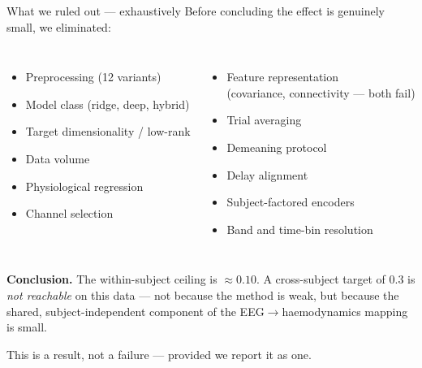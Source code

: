 \documentclass[aspectratio=169,11pt]{beamer}
\begin{document}
\begin{frame}{What we ruled out --- exhaustively}
Before concluding the effect is genuinely small, we eliminated:

\begin{columns}[t]
\begin{itemize}
  \item Preprocessing (12 variants)
  \item Model class (ridge, deep, hybrid)
  \item Target dimensionality / low-rank
  \item Data volume
  \item Physiological regression
  \item Channel selection
\end{itemize}
\begin{itemize}
  \item Feature representation \\ (covariance, connectivity --- both fail)
  \item Trial averaging
  \item Demeaning protocol
  \item Delay alignment
  \item Subject-factored encoders
  \item Band and time-bin resolution
\end{itemize}
\end{columns}

\vspace{0.8em}
\textbf{Conclusion.} The within-subject ceiling is $\approx0.10$. A cross-subject
target of $0.3$ is \emph{not reachable} on this data --- not because the method is
weak, but because the shared, subject-independent component of the
EEG$\rightarrow$haemodynamics mapping is small.

\vspace{0.4em}
\textcolor{warn}{This is a result, not a failure --- provided we report it as one.}
\end{frame}

\end{document}
